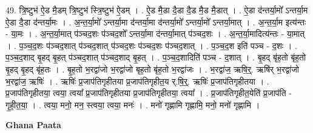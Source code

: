 \documentclass[17pt]{extarticle}
\begin{document}
49. त्रि॒ष्टुभ॑ ऐ॒ड मै॒डम् त्रि॒ष्टुभ॑ स्त्रि॒ष्टुभ॑ ऐ॒डम् । . ऐ॒ड मै॒डा दै॒डा दै॒ड मै॒ड मै॒डात् । . ऐ॒डा द॑न्तर्या॒मो᳚ ऽन्तर्या॒म ऐ॒डा दै॒डा द॑न्तर्या॒मः । . अ॒न्त॒र्या॒मो᳚ ऽन्तर्या॒मा द॑न्तर्या॒मा द॑न्तर्या॒मो᳚ ऽन्तर्या॒मो᳚ ऽन्तर्या॒मात् । . अ॒न्त॒र्या॒म इत्य॑न्तः - या॒मः । . अ॒न्त॒र्या॒मात् प॑ञ्चद॒शः प॑ञ्चद॒शो᳚ ऽन्तर्या॒मा द॑न्तर्या॒मात् प॑ञ्चद॒शः । . अ॒न्त॒र्या॒मादित्य॑न्तः - या॒मात् । . प॒ञ्च॒द॒शः प॑ञ्चद॒शात् प॑ञ्चद॒शात् प॑ञ्चद॒शः प॑ञ्चद॒शः प॑ञ्चद॒शात् । . प॒ञ्च॒द॒श इति॑ पञ्च - द॒शः । . प॒ञ्च॒द॒शाद् बृ॒हद् बृ॒हत् प॑ञ्चद॒शात् प॑ञ्चद॒शाद् बृ॒हत् । . प॒ञ्च॒द॒शादिति॑ पञ्च - द॒शात् । . बृ॒हद् बृ॑ह॒तो बृ॑ह॒तो बृ॒हद् बृ॒हद् बृ॑ह॒तः । . बृ॒ह॒तो भ॒रद्वा॑जो भ॒रद्वा॑जो बृह॒तो बृ॑ह॒तो भ॒रद्वा॑जः । . भ॒रद्वा॑ज॒ ऋषि॒र्॒. ऋषि॑र् भ॒रद्वा॑जो भ॒रद्वा॑ज॒ ऋषिः॑ । . ऋषिः॑ प्र॒जाप॑तिगृहीतया प्र॒जाप॑तिगृहीत॒य र्.षि॒र्॒. ऋषिः॑ प्र॒जाप॑तिगृहीतया । . प्र॒जाप॑तिगृहीतया॒ त्वया॒ त्वया᳚ प्र॒जाप॑तिगृहीतया प्र॒जाप॑तिगृहीतया॒ त्वया᳚ । . प्र॒जाप॑तिगृहीत॒येति॑ प्र॒जाप॑ति - गृ॒ही॒त॒या॒ । . त्वया॒ मनो॒ मन॒ स्त्वया॒ त्वया॒ मनः॑ । . मनो॑ गृह्णामि गृह्णामि॒ मनो॒ मनो॑ गृह्णामि । \newline

\textbf{Ghana Paata } \newline
\end{document}
